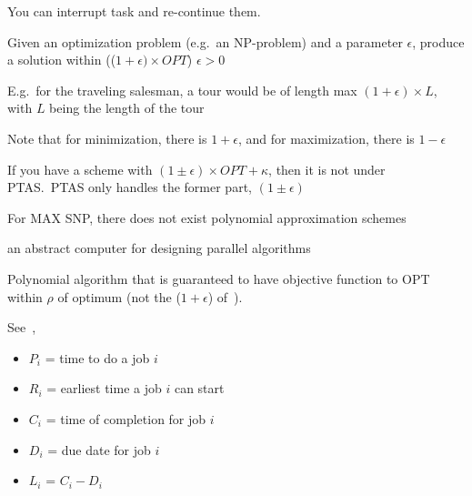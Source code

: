 \begin{definition}\label{pre-emptive}
    You can interrupt task and re-continue them.
\end{definition}


\begin{definition}\label{PTAS}
    Given an optimization problem (e.g.\ an NP-problem) and a parameter 
    $\epsilon$, produce a solution within (($1 + \epsilon) \times OPT$)
    $\epsilon > 0$

    E.g.\ for the traveling salesman, a tour would be of length max 
    $(1 + \epsilon) \times L$, with $L$ being the length of the tour

    Note that for minimization, there is $1 + \epsilon$, and for maximization,
    there is $1 - \epsilon$
    
    If you have a scheme with $(1 \pm \epsilon) \times OPT + \kappa$, then 
    it is not under PTAS.\ PTAS only handles the former part, $(1 \pm \epsilon)$

    For MAX SNP, there does not exist polynomial approximation schemes
\end{definition}

\begin{definition}
    an abstract computer for designing parallel algorithms

\end{definition}

\begin{definition}
    Polynomial algorithm that is guaranteed to have objective function
    to OPT within $\rho$ of
    optimum (not the ($1 + \epsilon$) of~).
\end{definition}

\begin{definition}[Scheduling]
    See~,
    \begin{itemize}
        \item \textbf{$P_{i}$} = time to do a job $i$
        \item \textbf{$R_{i}$} = earliest time a job $i$ can start
        \item \textbf{$C_{i}$} = time of completion for job $i$
        \item \textbf{$D_{i}$} = due date for job $i$
        \item \textbf{$L_{i}$} = $C_{i} - D_{i}$
    \end{itemize}
\end{definition}


